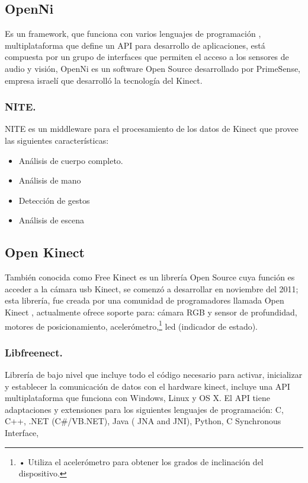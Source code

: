 \documentclass[11pt,a4paper]{article}
\begin{document}
\subsection{OpenNi}
Es un \gls{framework}, que funciona con varios lenguajes de programación , \gls{multiplataforma} que define un API para desarrollo de aplicaciones, está compuesta por un grupo de interfaces que permiten el acceso a los sensores de audio y visión, OpenNi es un software Open Source desarrollado por PrimeSense, empresa israelí que desarrolló la tecnología del Kinect.

\subsubsection{NITE.}
NITE es un \gls{middleware} para el procesamiento de los datos de Kinect que provee las siguientes características:
\begin{itemize}
	\item Análisis de cuerpo completo.
	\item Análisis de mano
	\item Detección de gestos 
	\item Análisis de escena 
\end{itemize} 

\subsection{Open Kinect}
También conocida como Free Kinect es un librería Open Source cuya función es acceder a la cámara usb Kinect, se comenzó a desarrollar en noviembre del 2011; esta librería, fue creada por una comunidad de programadores llamada Open Kinect \cite{openkinect}, actualmente ofrece soporte para:
cámara RGB y sensor de profundidad,
motores de posicionamiento,
acelerómetro,\footnote{• Utiliza el acelerómetro para obtener los grados de inclinación del dispositivo.}
led (indicador de estado).

\subsubsection{Libfreenect.}
Librería de bajo nivel que incluye todo el código necesario para activar, inicializar y establecer la comunicación de datos con el hardware kinect, incluye una API  multiplataforma que funciona con Windows, Linux  y OS X. El API tiene adaptaciones y extensiones para los siguientes lenguajes de programación: 
C, C++, .NET (C\#/VB.NET), Java ( JNA and JNI), Python, C Synchronous Interface,
\end{document}
